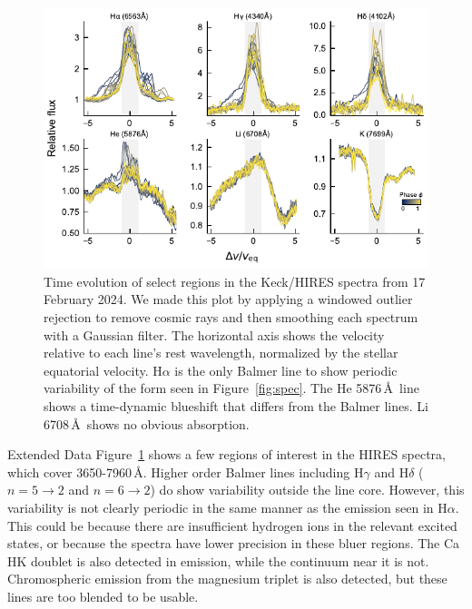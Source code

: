 \documentclass{nature3}
\begin{document}
\begin{methods}
\begin{figure}[!t]
  \centering
  \includegraphics[width=\textwidth]{figures/sf5.pdf}
  \caption{Time evolution of select regions in the Keck/HIRES spectra
  from 17 February 2024.  We made this plot by applying a windowed
  outlier rejection to remove cosmic rays and then smoothing each
  spectrum with a Gaussian filter.  The horizontal axis shows the
  velocity relative to each line's rest wavelength, normalized by the
  stellar equatorial velocity.  H$\alpha$ is the only Balmer line to
  show periodic variability of the form seen in Figure~\ref{fig:spec}.
  The He 5876\,\AA\ line shows a time-dynamic blueshift that differs
  from the Balmer lines.  Li 6708\,\AA\ shows no obvious absorption. }
  \label{fig:hirescuts}
\end{figure}

Extended Data Figure~\ref{fig:hirescuts} shows a few regions of
interest in the HIRES spectra, which cover 3650-7960\,\AA.  Higher
order Balmer lines including H$\gamma$ and H$\delta$
($n=5\rightarrow2$ and $n=6\rightarrow2$) do show variability outside
the line core.  However, this variability is not clearly periodic in
the same manner as the emission seen in H$\alpha$.  This could be
because there are insufficient hydrogen ions in the relevant excited
states, or because the spectra have lower precision in these bluer
regions.  The Ca HK doublet is also detected in emission, while the
continuum near it is not.  Chromospheric emission from the magnesium
triplet is also detected, but these lines are too blended to be
usable.


\end{methods}
\end{document}
